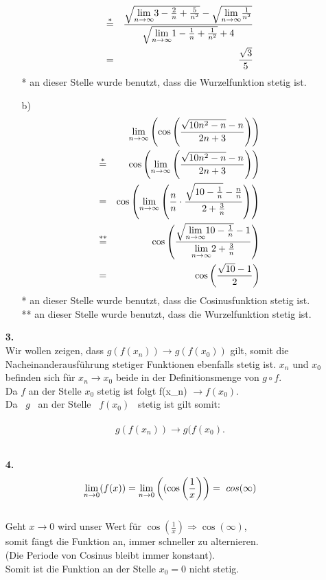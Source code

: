\documentclass[a4paper,12pt]{article}
\begin{document}
\begin{enumerate}
\begin{enumerate}
\begin{align*}
                        & \overset{*}{=} & \frac{\sqrt{\underset{n \to \infty}{\lim} 3-\frac{2}{n}+\frac{5}{n^2}}-\sqrt{\underset{n \to \infty}{\lim} \frac{1}{n^2}}}
                        {\sqrt{\underset{n \to \infty}{\lim} 1-\frac{1}{n}+\frac{1}{n^2}}+4} \\
                        &=& \frac{\sqrt{3}}{5}
                    \end{align*}
                * an dieser Stelle wurde benutzt, dass die Wurzelfunktion stetig ist.
                \item[b)]
                    \begin{align*}
                        &&\underset{n \to \infty}{\lim} \left( \cos \left( \frac{\sqrt{10n^2 -n}-n}{2n+3} \right) \right) \\
                        & \overset{*}{=} & \cos \left( \underset{n \to \infty}{\lim} \left( \frac{\sqrt{10n^2 -n}-n}{2n+3} \right) \right) \\
                        &=& \cos \left( \underset{n \to \infty}{\lim} \left( \frac{n}{n} \cdot \frac{\sqrt{10-\frac{1}{n}}-\frac{n}{n}}{2+\frac{3}{n}} \right) \right) \\
                        & \overset{**}{=} & \cos \left( \frac{\sqrt{\underset{n \to \infty}{\lim} 10-\frac{1}{n}}-1}{\underset{n \to \infty}{\lim} 2+\frac{3}{n}} \right) \\
                        &=& \cos \left( \frac{\sqrt{10}-1}{2} \right)
                    \end{align*}
                * an dieser Stelle wurde benutzt, dass die Cosinusfunktion stetig ist. \\
                ** an dieser Stelle wurde benutzt, dass die Wurzelfunktion stetig ist.
            \end{enumerate}
        \item[\textbf{3.}]    \ \\
                Wir wollen zeigen, dass  $g(f(x_n)) \rightarrow g(f(x_0))$  gilt,  somit die Nacheinanderausführung stetiger Funktionen ebenfalls stetig ist.
               $ x_n $ und  $x_0 $ befinden sich für  $x_n \rightarrow x_0 $ beide in der Definitionsmenge von  $g \circ f $.\\
                Da  $f $ an der Stelle  $x_0 $ stetig ist folgt  f(x_n) $\rightarrow f(x_0).$ \\
                Da \ $g$ \  an der Stelle \ $f(x_0)$ \  stetig ist gilt somit:\\ \\
                $$g(f(x_n)) \rightarrow g(f(x_0).$$\\
            

        \item[\textbf{4.}]
                $$ \underset{n \to 0}{\lim} (f(x)) = \underset{n \to 0}{\lim} \left((\cos\left(\frac{1}{x}\right)\right) = \ cos(\infty) $$ \\
                Geht  $x \rightarrow 0$  wird unser Wert für  $\cos(\frac{1}{x}) \Rightarrow \cos(\infty)$,
                \\somit fängt die Funktion an, immer schneller zu alternieren.\\ (Die Periode von Cosinus bleibt immer konstant). \\ Somit ist die Funktion an der Stelle $x_0 = 0$ nicht stetig.


\end{enumerate}
\end{document}

